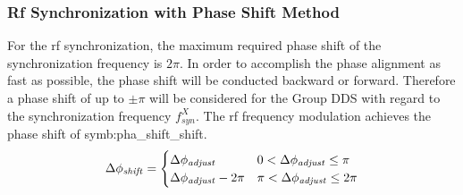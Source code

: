 \subsubsection{Rf Synchronization with Phase Shift Method}

For the rf synchronization, the maximum required phase shift of the synchronization frequency is $2\pi$. In order to accomplish the phase alignment as fast as possible, the phase shift will be conducted backward or forward. Therefore a phase shift of up to $\pm \pi$ will be considered for the Group DDS with regard to the synchronization frequency $f_\mathit{syn}^X$. The rf frequency modulation achieves the phase shift of \gls{symb:pha_shift_shift}. 
\begin{eqnarray}\Delta \phi_\mathit{shift}=
\begin{cases} 


\Delta \phi_\mathit{adjust} & 0<\Delta \phi_\mathit{adjust}\le\pi \cr

\Delta \phi_\mathit{adjust} -2\pi &  \pi<\Delta \phi_\mathit{adjust}\le2\pi 


\label{phase_shift_eq}
\end{cases}
\end{eqnarray} 


